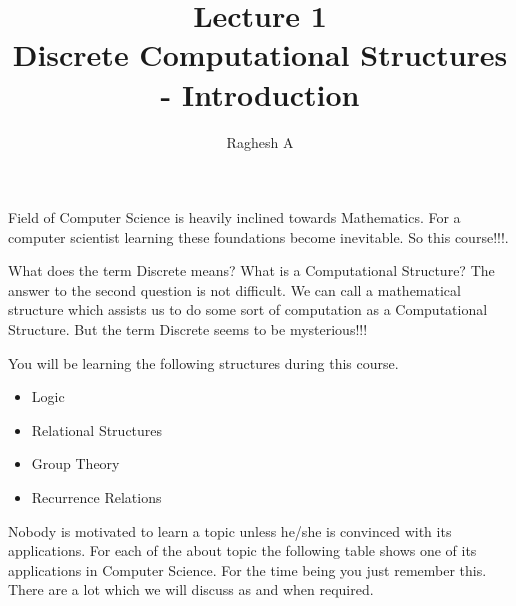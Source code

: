 \documentclass[a4paper,12pt]{article}
\title{Lecture 1\\Discrete Computational Structures - Introduction}
\date{}
\author{Raghesh A}
\begin{document}
\maketitle
Field of Computer Science is heavily inclined towards Mathematics. For a
computer scientist learning these foundations become inevitable.
So this course!!!.

What does the term Discrete means? What is a Computational Structure? The
answer to the second question is not difficult. We can call a mathematical
structure which assists us to do some sort of computation as a Computational
Structure. But the term Discrete seems to be mysterious!!!

You will be learning the following structures during this course.

\begin{itemize}
\item Logic
\item Relational Structures
\item Group Theory
\item Recurrence Relations
\end{itemize}

Nobody is motivated to learn a topic unless he/she is convinced with
its applications. For each of the about topic the following table shows one
of its applications in Computer Science. For the time being you just remember
this. There are a lot which we will discuss as and when required.
\end{document}
